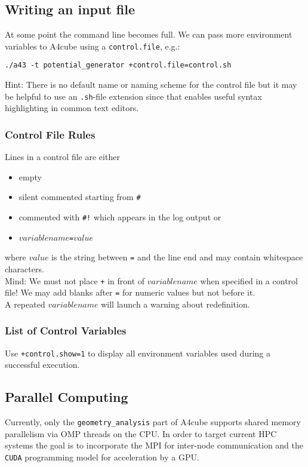 \documentclass[oribibl]{llncs}
\newcommand{\ttt}[1]{\texttt{#1}}
\newcommand{\codename}{A4cube}
\begin{document}
%
\subsection{Writing an input file} \label{sec:control-file}
%
At some point the command line becomes full.
We can pass more environment variables to \codename{} using a \ttt{control.file}, e.g.:
\begin{verbatim}
./a43 -t potential_generator +control.file=control.sh
\end{verbatim}
Hint: There is no default name or naming scheme for the control file 
but it may be helpful to use an \ttt{.sh}-file extension since that
enables useful syntax highlighting in common text editors.
%
%

\subsubsection{Control File Rules} \label{sec:control-file-rules}
%
Lines in a control file are either 
\begin{itemize}
    \item empty
    \item silent commented starting from \ttt{\#}
    \item commented with \ttt{\#!} which appears in the log output or
    \item $variablename$\ttt{=}$value$
\end{itemize}
where $value$ is the string between \ttt{=} and the line end and may contain whitespace characters.
\\
Mind: We must not place \ttt{+} in front of $variablename$ when specified in a control file!
We may add blanks after \ttt{=} for numeric values but not before it.
\\
A repeated $variablename$ will launch a warning about redefinition.
%
%

\subsubsection{List of Control Variables}
%
Use \ttt{+control.show=1} to display all environment variables used during a successful execution.
%
%


\subsection{Parallel Computing} \label{sec:parallelization}
%
Currently, only the \ttt{geometry\_analysis} part of \codename{} supports shared memory parallelism 
via \ac{OMP} threads on the \ac{CPU}.
In order to target current \ac{HPC} systems 
the goal is to incorporate the \ac{MPI}
for inter-node communication
and the \ttt{CUDA} programming model for acceleration by a \ac{GPU}.
\end{document}
